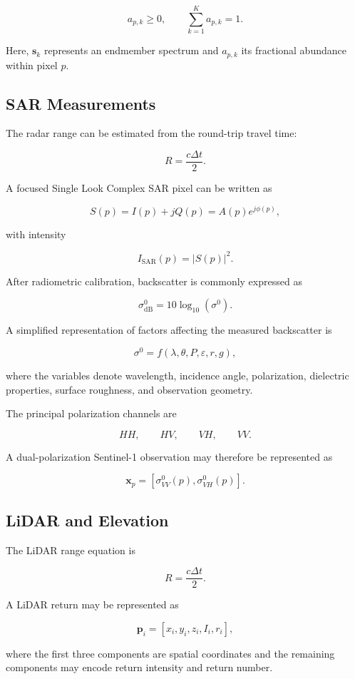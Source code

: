\documentclass[11pt,a4paper]{article}
\begin{document}
\[
a_{p,k}\geq0,
\qquad
\sum_{k=1}^{K}a_{p,k}=1.
\]

Here, \(\mathbf{s}_k\) represents an endmember spectrum and \(a_{p,k}\)
its fractional abundance within pixel \(p\).

\subsection{SAR Measurements}

The radar range can be estimated from the round-trip travel time:

\[
R=\frac{c\Delta t}{2}.
\]

A focused Single Look Complex SAR pixel can be written as

\[
S(p)=I(p)+jQ(p)=A(p)e^{j\phi(p)},
\]

with intensity

\[
I_{\mathrm{SAR}}(p)=|S(p)|^2.
\]

After radiometric calibration, backscatter is commonly expressed as

\[
\sigma^0_{\mathrm{dB}}
=
10\log_{10}(\sigma^0).
\]

A simplified representation of factors affecting the measured
backscatter is

\[
\sigma^0 =
f(\lambda,\theta,P,\varepsilon,r,g),
\]

where the variables denote wavelength, incidence angle, polarization,
dielectric properties, surface roughness, and observation geometry.

The principal polarization channels are

\[
HH,\qquad HV,\qquad VH,\qquad VV.
\]

A dual-polarization Sentinel-1 observation may therefore be represented as

\[
\mathbf{x}_p =
\left[
\sigma^0_{VV}(p),
\sigma^0_{VH}(p)
\right].
\]

\subsection{LiDAR and Elevation}

The LiDAR range equation is

\[
R=\frac{c\Delta t}{2}.
\]

A LiDAR return may be represented as

\[
\mathbf{p}_i=
[x_i,y_i,z_i,I_i,r_i],
\]

where the first three components are spatial coordinates and the
remaining components may encode return intensity and return number.
\end{document}
